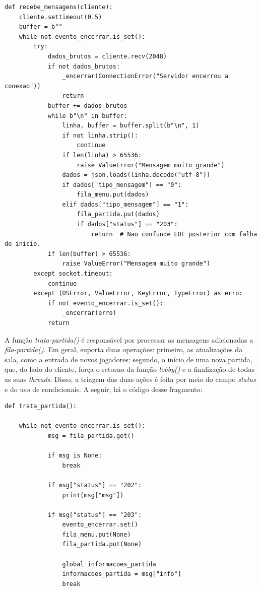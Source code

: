 \documentclass[11pt,a4paper]{article}
\begin{document}
\begin{verbatim}
def recebe_mensagens(cliente):
    cliente.settimeout(0.5)
    buffer = b""
    while not evento_encerrar.is_set():
        try:
            dados_brutos = cliente.recv(2048)
            if not dados_brutos:
                _encerrar(ConnectionError("Servidor encerrou a conexao"))
                return
            buffer += dados_brutos
            while b"\n" in buffer:
                linha, buffer = buffer.split(b"\n", 1)
                if not linha.strip():
                    continue
                if len(linha) > 65536:
                    raise ValueError("Mensagem muito grande")
                dados = json.loads(linha.decode("utf-8"))
                if dados["tipo_mensagem"] == "0":
                    fila_menu.put(dados)
                elif dados["tipo_mensagem"] == "1":
                    fila_partida.put(dados)
                    if dados["status"] == "203":
                        return  # Nao confunde EOF posterior com falha de inicio.
            if len(buffer) > 65536:
                raise ValueError("Mensagem muito grande")
        except socket.timeout:
            continue
        except (OSError, ValueError, KeyError, TypeError) as erro:
            if not evento_encerrar.is_set():
                _encerrar(erro)
            return
\end{verbatim}

A função \textit{trata-partida()} é responsável por processar as mensagens adicionadas a \textit{fila-partida()}. Em geral, suporta duas operações: primeiro, as atualizações da sala, como a entrada de novos jogadores; segundo, o início de uma nova partida, que, do lado do cliente, força o retorno da função \textit{lobby()} e a finalização de todas as suas \textit{threads}. Disso, a triagem das duas ações é feita por meio do campo \textit{status} e do uso de condicionais. A seguir, há o código desse fragmento:

\begin{verbatim}
def trata_partida():
    
    while not evento_encerrar.is_set():
            msg = fila_partida.get()

            if msg is None:
                break

            if msg["status"] == "202":
                print(msg["msg"])

            if msg["status"] == "203":
                evento_encerrar.set()
                fila_menu.put(None)
                fila_partida.put(None)

                global informacoes_partida
                informacoes_partida = msg["info"]
                break
\end{verbatim}
\end{document}
